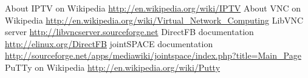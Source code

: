 
\begin{thebibliography}{9}
{}


 About IPTV on Wikipedia \url{http://en.wikipedia.org/wiki/IPTV}
 About VNC on Wikipedia \url{http://en.wikipedia.org/wiki/Virtual_Network_Computing}
LibVNC server \url{http://libvncserver.sourceforge.net}
DirectFB documentation \url{http://elinux.org/DirectFB}
jointSPACE documentation \url{http://sourceforge.net/apps/mediawiki/jointspace/index.php?title=Main_Page}
PuTTy on Wikipedia \url{http://en.wikipedia.org/wiki/Putty}


\end{thebibliography}
